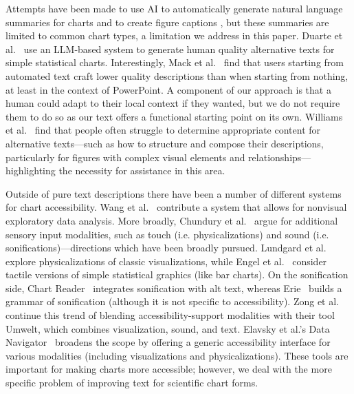 \documentclass{egpubl}
\newcommand{\etal}{et al.}
\newcommand{\etals}{et al.'s}
\newcommand{\ie}{{i.e.}}
\begin{document}
Attempts have been made to use AI to automatically generate natural language summaries for charts \cite{obeid_chart-text_2020} and to create figure captions \cite{qian_formative_2020, qian_generating_2021}, but these summaries are limited to common chart types, a limitation we address in this paper.
Duarte \etal{}~\cite{duarte_autovizua11y_2024} use an LLM-based system to generate human quality alternative texts for simple statistical charts.
Interestingly, Mack \etal{}~\cite{mack_designing_2021} find that users starting from automated text craft lower quality descriptions than when starting from nothing, at least in the context of PowerPoint.
A component of our approach is that a human could adapt to their local context if they wanted, but we do not require them to do so as our text offers a functional starting point on its own.
Williams \etal{}~\cite{williams_supporting_2022} find that people often struggle to determine appropriate content for alternative texts---such as how to structure and compose their descriptions, particularly for figures with complex visual elements and relationships---highlighting the necessity for assistance in this area.


Outside of pure text descriptions there have been a number of different systems for chart accessibility.
Wang \etal{}~\cite{wang_enabling_2024} contribute a system that allows for nonvisual exploratory data analysis.
More broadly, Chundury \etal{}~\cite{chundury_understanding_2022} argue for additional sensory input modalities, such as touch (\ie{} physicalizations) and sound (\ie{} sonifications)---directions which have been broadly pursued.
Lundgard \etal{}~\cite{lundgard_sociotechnical_2019} explore physicalizations of classic visualizations, while Engel \etal{}~\cite{engel_user_2018} consider tactile versions of simple statistical graphics (like bar charts).
On the sonification side, Chart Reader~\cite{thompson_chart_2023} integrates sonification with alt text, whereas Erie~\cite{kim_erie_2024} builds a grammar of sonification (although it is not specific to accessibility).
Zong \etal{}~\cite{zong_umwelt_2024} continue this trend of blending accessibility-support modalities with their tool Umwelt, which combines visualization, sound, and text.
Elavsky \etals{} Data Navigator~\cite{elavsky_data_2024} broadens the scope by offering a generic accessibility interface for various modalities (including visualizations and physicalizations).
These tools are important for making charts more accessible; however, we deal with the more specific problem of improving text for scientific chart forms.
\end{document}

